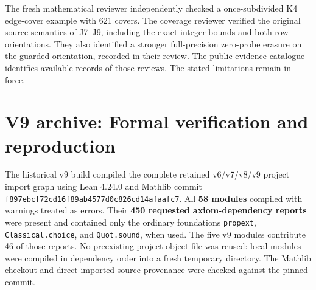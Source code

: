 \documentclass[
  11pt,
]{article}
\begin{document}
The fresh mathematical reviewer independently checked a once-subdivided
K4 edge-cover example with 621 covers. The coverage reviewer verified
the original source semantics of J7--J9, including the exact integer
bounds and both row orientations. They also identified a stronger
full-precision zero-probe erasure on the guarded orientation, recorded
in their review. The public evidence catalogue identifies available
records of those reviews. The stated limitations remain in force.

\section{V9 archive: Formal verification and reproduction}\label{v9-section-formal-status}

The historical v9 build compiled the complete retained v6/v7/v8/v9
project import graph using Lean 4.24.0 and Mathlib commit
\nolinkurl{f897ebcf72cd16f89ab4577d0c826cd14afaafc7}. All \textbf{58
modules} compiled with warnings treated as errors. Their \textbf{450
requested axiom-dependency reports} were present and contained only the
ordinary foundations \texttt{propext}, \texttt{Classical.choice}, and
\texttt{Quot.sound}, when used. The five v9 modules contribute 46 of
those reports. No preexisting project object file was reused: local
modules were compiled in dependency order into a fresh temporary
directory. The Mathlib checkout and direct imported source provenance
were checked against the pinned commit.
\end{document}

